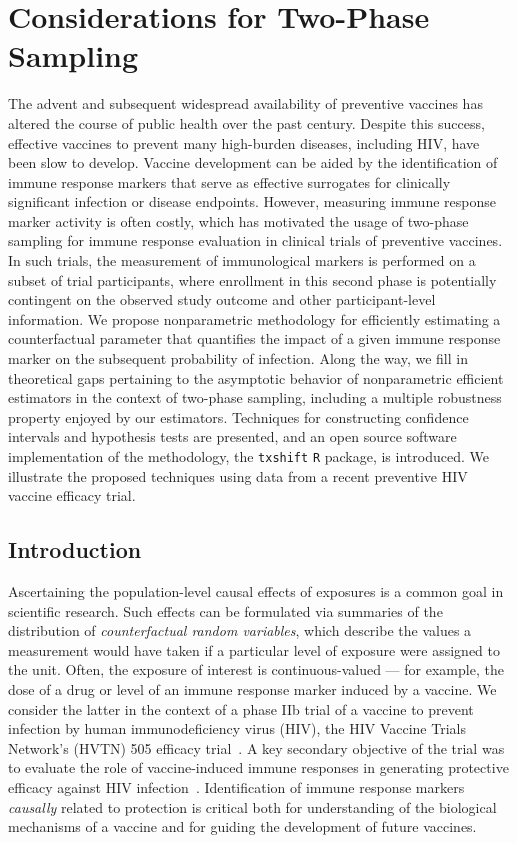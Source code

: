 \chapter{Considerations for Two-Phase Sampling}

The advent and subsequent widespread availability of preventive vaccines has
altered the course of public health over the past century. Despite this success,
effective vaccines to prevent many high-burden diseases, including HIV, have
been slow to develop. Vaccine development can be aided by the identification of
immune response markers that serve as effective surrogates for clinically
significant infection or disease endpoints. However, measuring immune response
marker activity is often costly, which has motivated the usage of two-phase
sampling for immune response evaluation in clinical trials of preventive
vaccines. In such trials, the measurement of immunological markers is performed
on a subset of trial participants, where enrollment in this second phase is
potentially contingent on the observed study outcome and other participant-level
information. We propose nonparametric methodology for efficiently estimating
a counterfactual parameter that quantifies the impact of a given immune response
marker on the subsequent probability of infection. Along the way, we fill in
theoretical gaps pertaining to the asymptotic behavior of nonparametric
efficient estimators in the context of two-phase sampling, including a multiple
robustness property enjoyed by our estimators. Techniques for constructing
confidence intervals and hypothesis tests are presented, and an open source
software implementation of the methodology, the \texttt{txshift} \texttt{R}
package, is introduced. We illustrate the proposed techniques using data from
a recent preventive HIV vaccine efficacy trial.

\section{Introduction}\label{intro}

Ascertaining the population-level causal effects of exposures is a common goal
in scientific research. Such effects can be formulated via summaries of the
distribution of \emph{counterfactual random variables}, which describe the
values a measurement would have taken if a particular level of exposure were
assigned to the unit. Often, the exposure of interest is continuous-valued ---
for example, the dose of a drug or level of an immune response marker induced by
a vaccine. We consider the latter in the context of a phase IIb trial of
a vaccine to prevent infection by human immunodeficiency virus (HIV), the HIV
Vaccine Trials Network's (HVTN) 505 efficacy trial~\citep{hammer2013efficacy}.
A key secondary objective of the trial was to evaluate the role of
vaccine-induced immune responses in generating protective efficacy against HIV
infection~\citep{janes2017higher}. Identification of immune response markers
\textit{causally} related to protection is critical both for understanding of
the biological mechanisms of a vaccine and for guiding the development of future
vaccines.

